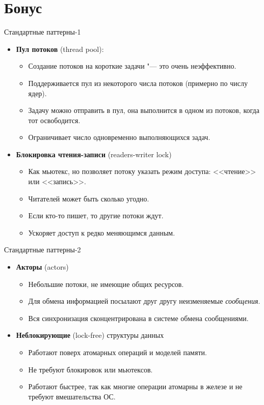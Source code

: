 \section{Бонус}

\begin{frame}
\end{frame}

\begin{frame}{Стандартные паттерны-1}
	\begin{itemize}
		\item
			\textbf{Пул потоков} (thread pool):
			\begin{itemize}
				\item Создание потоков на короткие задачи "--- это очень неэффективно.
				\item Поддерживается пул из некоторого числа потоков (примерно по числу ядер).
				\item Задачу можно отправить в пул, она выполнится в одном из потоков, когда тот освободится.
				\item Ограничивает число одновременно выполняющихся задач.
			\end{itemize}
		\item
			\textbf{Блокировка чтения-записи} (readers-writer lock)
			\begin{itemize}
				\item Как мьютекс, но позволяет потоку указать режим доступа: <<чтение>> или <<запись>>.
				\item Читателей может быть сколько угодно.
				\item Если кто-то пишет, то другие потоки ждут.
				\item Ускоряет доступ к редко меняющимся данным.
			\end{itemize}
	\end{itemize}
\end{frame}

\begin{frame}{Стандартные паттерны-2}
	\begin{itemize}
		\item
			\textbf{Акторы} (actors)
			\begin{itemize}
				\item Небольшие потоки, не имеющие общих ресурсов.
				\item Для обмена информацией посылают друг другу неизменяемые \textit{сообщения}.
				\item Вся синхронизация сконцентрирована в системе обмена сообщениями.
			\end{itemize}
		\item
			\textbf{Неблокирующие} (lock-free) структуры данных
			\begin{itemize}
				\item Работают поверх атомарных операций и моделей памяти.
				\item Не требуют блокировок или мьютексов.
				\item Работают быстрее, так как многие операции атомарны в железе и не требуют вмешательства ОС.
			\end{itemize}
	\end{itemize}
\end{frame}

